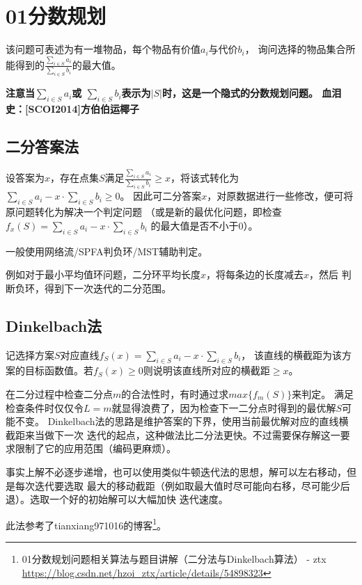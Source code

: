 \section{01分数规划}
该问题可表述为有一堆物品，每个物品有价值$a_i$与代价$b_i$，
询问选择的物品集合所能得到的$\frac{\displaystyle \sum_{i\in S}{a_i}}
	{\displaystyle \sum_{i\in S}{b_i}}$的最大值。

{\bfseries 注意当$\displaystyle \sum_{i\in S}{a_i}$或
$\displaystyle \sum_{i\in S}{b_i}$表示为$|S|$时，这是一个隐式的分数规划问题。
血泪史：[SCOI2014]方伯伯运椰子}

\subsection{二分答案法}

设答案为$x$，存在点集$S$满足$\frac{\displaystyle \sum_{i\in S}{a_i}}
	{\displaystyle \sum_{i\in S}{b_i}}\geq x$，将该式转化为
$\displaystyle \sum_{i\in S}{a_i}-x\cdot \sum_{i\in S}{b_i}\geq 0$。
因此可二分答案$x$，对原数据进行一些修改，便可将原问题转化为解决一个判定问题
（或是新的最优化问题，即检查
$\displaystyle f_x(S)=\sum_{i\in S}{a_i}-x\cdot \sum_{i\in S}{b_i}$
的最大值是否不小于0）。

一般使用网络流/SPFA判负环/MST辅助判定。

例如对于最小平均值环问题，二分环平均长度$x$，将每条边的长度减去$x$，然后
判断负环，得到下一次迭代的二分范围。

\subsection{Dinkelbach法}
记选择方案$S$对应直线$f_S(x)=\displaystyle \sum_{i\in S}{a_i}-x\cdot \sum_{i\in S}{b_i}$，
该直线的横截距为该方案的目标函数值。若$f_S(x)\geq 0$则说明该直线所对应的横截距$\geq x$。

在二分过程中检查二分点$m$的合法性时，有时通过求$max\{f_m(S)\}$来判定。
满足检查条件时仅仅令$L=m$就显得浪费了，因为检查下一二分点时得到的最优解$S$可能不变。
Dinkelbach法的思路是维护答案的下界，使用当前最优解对应的直线横截距来当做下一次
迭代的起点，这种做法比二分法更快。不过需要保存解这一要求限制了它的应用范围（编码更麻烦）。

事实上解不必逐步递增，也可以使用类似牛顿迭代法的思想，解可以左右移动，但是每次迭代要选取
最大的移动截距（例如取最大值时尽可能向右移，尽可能少后退）。选取一个好的初始解可以大幅加快
迭代速度。

此法参考了tianxiang971016的博客\footnote{
	01分数规划问题相关算法与题目讲解（二分法与Dinkelbach算法） - ztx\\
	\url{https://blog.csdn.net/hzoi\_ztx/article/details/54898323}
}。

